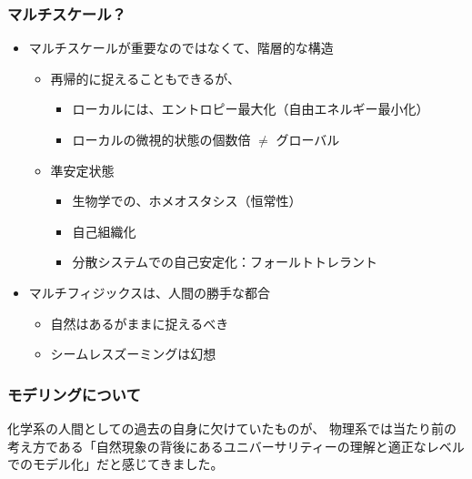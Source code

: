 \documentclass[12pt, dvipdfmx]{beamer}
\begin{document}
\begin{frame}
    \frametitle{マルチスケール？}
    \begin{itemize}
        \item マルチスケールが重要なのではなくて、階層的な構造
        \begin{itemize}
            \item 再帰的に捉えることもできるが、
            \begin{itemize}
                \item ローカルには、エントロピー最大化（自由エネルギー最小化）
                \item ローカルの微視的状態の個数倍 $\neq$ グローバル
            \end{itemize}
            \item 準安定状態
            \begin{itemize}
                \item 生物学での、ホメオスタシス（恒常性）
                \item 自己組織化
                \item 分散システムでの自己安定化：フォールトトレラント
            \end{itemize}
        \end{itemize}
        \item マルチフィジックスは、人間の勝手な都合
        \begin{itemize}
            \item 自然はあるがままに捉えるべき
            \item シームレスズーミングは幻想
        \end{itemize}
    \end{itemize}
\end{frame}

\begin{frame}
    \frametitle{モデリングについて}

    化学系の人間としての過去の自身に欠けていたものが、
物理系では当たり前の考え方である「自然現象の背後にあるユニバーサリティーの理解と適正なレベルでのモデル化」だと感じてきました。

\end{frame}
\end{document}
